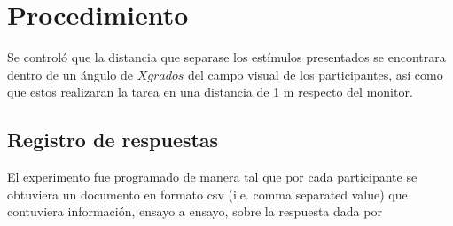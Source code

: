 \section{Procedimiento}




Se controló que la distancia que separase los estímulos presentados se encontrara dentro de un ángulo de $X grados$ del campo visual de los participantes, así como que estos realizaran la tarea en una distancia de 1 m respecto del monitor.



\subsection{Registro de respuestas}

El experimento fue programado de manera tal que por cada participante se obtuviera un documento en formato csv (i.e. comma separated value) que contuviera información, ensayo a ensayo, sobre la respuesta dada por 
